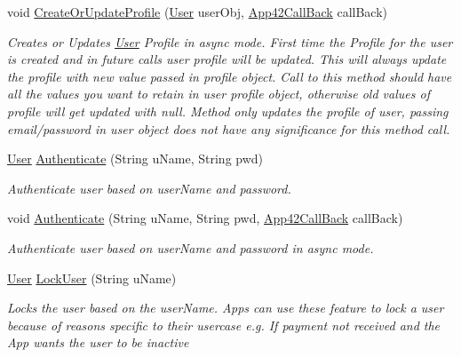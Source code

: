 \begin{DoxyCompactItemize}
void \hyperlink{classcom_1_1shephertz_1_1app42_1_1paas_1_1sdk_1_1csharp_1_1user_1_1_user_service_ac1a4f44eff29ab858bf5812d9d226296}{Create\+Or\+Update\+Profile} (\hyperlink{classcom_1_1shephertz_1_1app42_1_1paas_1_1sdk_1_1csharp_1_1user_1_1_user}{User} user\+Obj, \hyperlink{interfacecom_1_1shephertz_1_1app42_1_1paas_1_1sdk_1_1csharp_1_1_app42_call_back}{App42\+Call\+Back} call\+Back)
\begin{DoxyCompactList}\small\item\em Creates or Updates \hyperlink{classcom_1_1shephertz_1_1app42_1_1paas_1_1sdk_1_1csharp_1_1user_1_1_user}{User} Profile in async mode. First time the Profile for the user is created and in future calls user profile will be updated. This will always update the profile with new value passed in profile object. Call to this method should have all the values you want to retain in user profile object, otherwise old values of profile will get updated with null. Method only updates the profile of user, passing email/password in user object does not have any significance for this method call. \end{DoxyCompactList}\item 
\hyperlink{classcom_1_1shephertz_1_1app42_1_1paas_1_1sdk_1_1csharp_1_1user_1_1_user}{User} \hyperlink{classcom_1_1shephertz_1_1app42_1_1paas_1_1sdk_1_1csharp_1_1user_1_1_user_service_a0acb9894e479d55d34e45081ba267b55}{Authenticate} (String u\+Name, String pwd)
\begin{DoxyCompactList}\small\item\em Authenticate user based on user\+Name and password. \end{DoxyCompactList}\item 
void \hyperlink{classcom_1_1shephertz_1_1app42_1_1paas_1_1sdk_1_1csharp_1_1user_1_1_user_service_aed716bf5f188c2aa8cf9e93914d73695}{Authenticate} (String u\+Name, String pwd, \hyperlink{interfacecom_1_1shephertz_1_1app42_1_1paas_1_1sdk_1_1csharp_1_1_app42_call_back}{App42\+Call\+Back} call\+Back)
\begin{DoxyCompactList}\small\item\em Authenticate user based on user\+Name and password in async mode. \end{DoxyCompactList}\item 
\hyperlink{classcom_1_1shephertz_1_1app42_1_1paas_1_1sdk_1_1csharp_1_1user_1_1_user}{User} \hyperlink{classcom_1_1shephertz_1_1app42_1_1paas_1_1sdk_1_1csharp_1_1user_1_1_user_service_a91b0e16f85bbee948fc276533a18c710}{Lock\+User} (String u\+Name)
\begin{DoxyCompactList}\small\item\em Locks the user based on the user\+Name. Apps can use these feature to lock a user because of reasons specific to their usercase e.\+g. If payment not received and the App wants the user to be inactive \end{DoxyCompactList}\item 

\end{DoxyCompactItemize}
